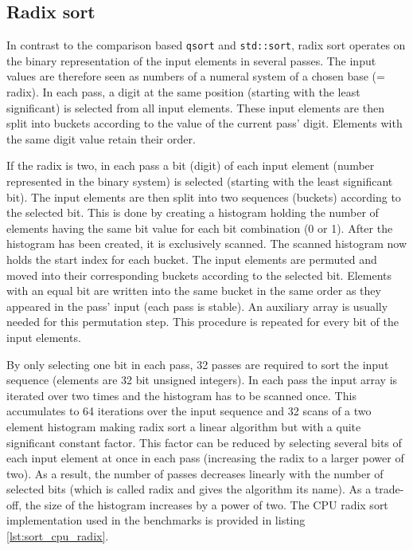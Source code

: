 \subsection{Radix sort}
\label{sec:sorting_radix_cpu}

In contrast to the comparison based \lstinline!qsort! and \lstinline!std::sort!, radix sort operates on the binary representation of the input elements in several passes. The input values are therefore seen as numbers of a numeral system of a chosen base (= radix). In each pass, a digit at the same position (starting with the least significant) is selected from all input elements. These input elements are then split into buckets according to the value of the current pass' digit. Elements with the same digit value retain their order.

If the radix is two, in each pass a bit (digit) of each input element (number represented in the binary system) is selected (starting with the least significant bit). The input elements are then split into two sequences (buckets) according to the selected bit. This is done by creating a histogram holding the number of elements having the same bit value for each bit combination (0 or 1). After the histogram has been created, it is exclusively scanned. The scanned histogram now holds the start index for each bucket. The input elements are permuted and moved into their corresponding buckets according to the selected bit. Elements with an equal bit are written into the same bucket in the same order as they appeared in the pass' input (each pass is stable). An auxiliary array is usually needed for this permutation step. This procedure is repeated for every bit of the input elements. 

By only selecting one bit in each pass, 32 passes are required to sort the input sequence (elements are 32 bit unsigned integers). In each pass the input array is iterated over two times and the histogram has to be scanned once. This accumulates to 64 iterations over the input sequence and 32 scans of a two element histogram making radix sort a linear algorithm but with a quite significant constant factor. This factor can be reduced by selecting several bits of each input element at once in each pass (increasing the radix to a larger power of two). As a result, the number of passes decreases linearly with the number of selected bits (which is called radix and gives the algorithm its name). As a trade-off, the size of the histogram increases by a power of two.
The CPU radix sort implementation used in the benchmarks is provided in listing \ref{lst:sort_cpu_radix}.

